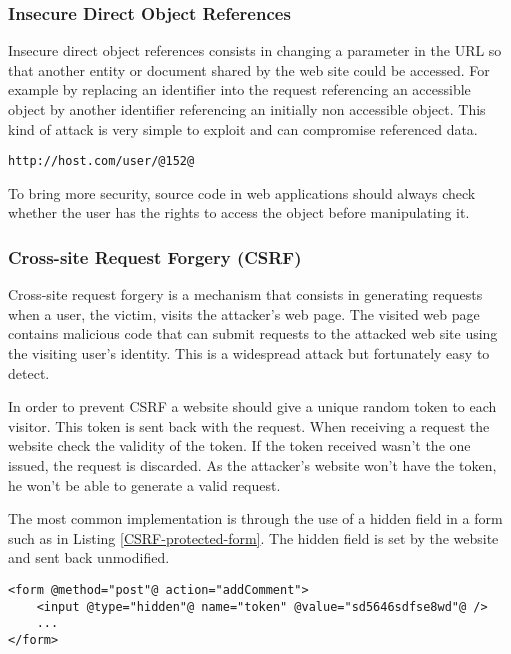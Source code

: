 \subsubsection{Insecure Direct Object References}

Insecure direct object references consists in changing a parameter in the URL
so that another entity or document shared by the web site could be accessed.
For example by replacing an identifier into the request referencing an
accessible object by another identifier referencing an initially non accessible
object. This kind of attack is very simple to exploit and can compromise
referenced data.

\begin{lstlisting}[style=beamer]
http://host.com/user/@152@
\end{lstlisting}

To bring more security, source code in web applications should
always check whether the user has the rights to access the object before
manipulating it.

\subsubsection{Cross-site Request Forgery (CSRF)}

Cross-site request forgery is a mechanism that consists in generating requests
when a user, the victim, visits the attacker's web page. The visited web page
contains malicious code that can submit requests to the attacked web site
using the visiting user's identity.
This is a widespread attack but fortunately easy to detect.


In order to prevent CSRF a website should give a unique random token
to each visitor. This token is sent back with the request. When
receiving a request the website check the validity of the token. If
the token received wasn't the one issued, the request is discarded. As
the attacker's website won't have the token, he won't be able to
generate a valid request.

The most common implementation is through the use of a hidden field in
a form such as in Listing \ref{CSRF-protected-form}. The hidden field is set by
the website and sent back unmodified.
\begin{lstlisting}[style=beamer,
	label={CSRF-protected-form},
	caption={A protected form against CSRF}]
<form @method="post"@ action="addComment">
	<input @type="hidden"@ name="token" @value="sd5646sdfse8wd"@ />
	...
</form>
\end{lstlisting}


